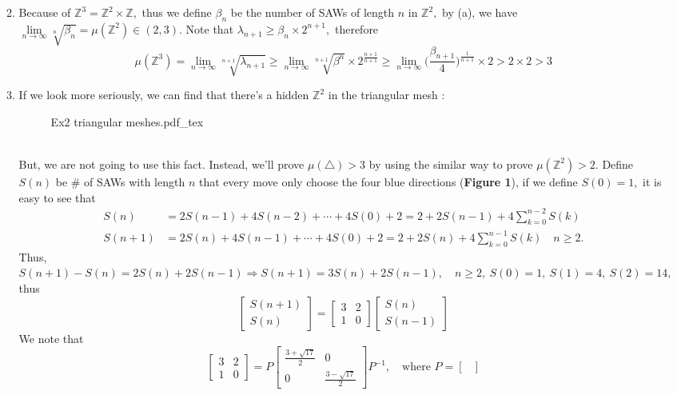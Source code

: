 \documentclass[12pt,a4paper]{article}
\newcommand{\incfig}[1]{%
{#1.pdf_tex}
}
\begin{document}
\begin{enumerate}
\begin{enumerate}
\[		\]
		\item Because of $\mathbb{Z}^3=\mathbb{Z}^2\times \mathbb{Z},$ thus we define $\beta_n$ be the number of SAWs of length $n$ in $\mathbb{Z}^2,$ by (a), we have $\lim\limits_{n\to\infty}\sqrt[n]{\beta_n}=\mu(\mathbb{Z}^2)\in(2,3).$ Note that $\lambda_{n+1}\geq \beta_n\times 2^{n+1},$ therefore 
		\[
		\mu(\mathbb{Z}^3)=\lim_{n\to\infty}\sqrt[n+1]{\lambda_{n+1}}\geq \lim_{n\to\infty}\sqrt[n+1]{\beta^n}\times 2^{\frac{n+1}{n+1}}\geq \lim_{n\to\infty}\Big(\frac{\beta_{n+1}}{4}\Big)^{\frac{1}{n+1}}\times 2>2\times 2>3
		\]
		\item If we look more seriously, we can find that there's a hidden $\mathbb{Z}^2$ in the triangular mesh :
		\begin{figure}[htp]
		\centering
		\def\svgwidth{6cm}
		\incfig{Ex2 triangular meshes}
		\end{figure}
		\\
		But, we are not going to use this fact. Instead, we'll prove $\mu(\triangle)>3$ by using the similar way to prove $\mu(\mathbb{Z}^2)>2.$ Define $S(n)$ be \# of SAWs with length $n$ that every move only choose the four blue directions (\textbf{Figure 1}), if we define $S(0)=1,$ it is easy to see that 
		\begin{align*}
		S(n)&=2S(n-1)+4S(n-2)+\cdots +4S(0)+2=2+2S(n-1)+4\sum_{k=0}^{n-2}S(k)\\
		S(n+1)&=2S(n)+4S(n-1)+\cdots +4S(0)+2=2+2S(n)+4\sum_{k=0}^{n-1}S(k)\quad n\geq 2.
		\end{align*}
		\newpage
		Thus, $S(n+1)-S(n)=2S(n)+2S(n-1)\Rightarrow S(n+1)=3S(n)+2S(n-1),\quad n\geq 2,\ S(0)=1,\ S(1)=4,\ S(2)=14,$ thus
		\[
		\begin{bmatrix}
		S(n+1)\\
		S(n)
		\end{bmatrix}=\begin{bmatrix}
		3 & 2\\
		1 & 0
		\end{bmatrix}\begin{bmatrix}
		S(n)\\
		S(n-1)
		\end{bmatrix}
		\]
		We note that 
		\[
		\begin{bmatrix}
		3 & 2\\
		1 & 0
		\end{bmatrix}=P\begin{bmatrix}
		\frac{3+\sqrt{17}}{2} & 0\\
		0 & \frac{3-\sqrt{17}}{2}
		\end{bmatrix}P^{-1},\quad\mbox{where }P=\begin{bmatrix}

\end{bmatrix}\]
\end{enumerate}
\end{enumerate}
\end{document}
